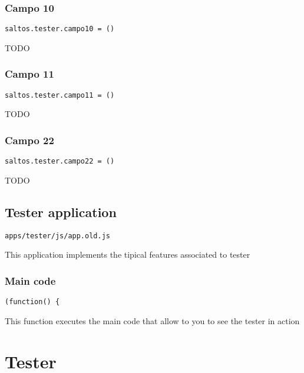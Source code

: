 \documentclass[a4paper]{article}
\begin{document}
\subsubsection{Campo 10}

\begin{lstlisting}
saltos.tester.campo10 = ()
\end{lstlisting}

TODO

\hypertarget{toc98}{}
\subsubsection{Campo 11}

\begin{lstlisting}
saltos.tester.campo11 = ()
\end{lstlisting}

TODO

\hypertarget{toc99}{}
\subsubsection{Campo 22}

\begin{lstlisting}
saltos.tester.campo22 = ()
\end{lstlisting}

TODO

\hypertarget{toc100}{}
\subsection{Tester application}

\begin{lstlisting}
apps/tester/js/app.old.js
\end{lstlisting}

This application implements the tipical features associated to tester

\hypertarget{toc101}{}
\subsubsection{Main code}

\begin{lstlisting}
(function() {
\end{lstlisting}

This function executes the main code that allow to you to see the tester in action


\hypertarget{toc102}{}
\section{Tester}
\end{document}
